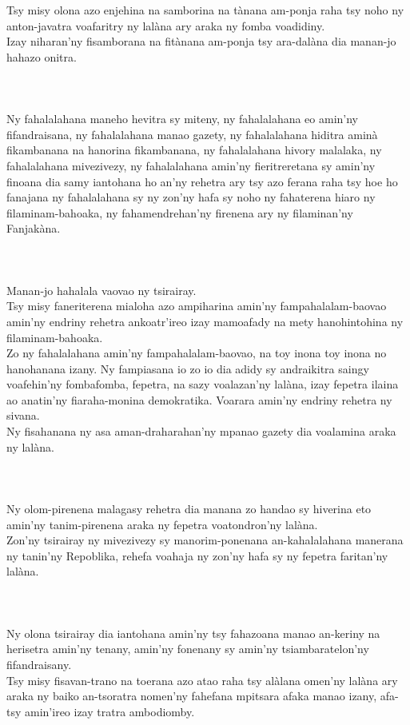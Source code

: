 \documentclass[12pt]{article}
\newcounter{laharana}
\newcommand{\andininy}[0]{
  \paragraph{%
    \NoCaseChange{%
      Andininy~\addtocounter{laharana}{1}\thelaharana.}\label{and:\thelaharana}~%
  }%
}
\begin{document}
\noindent
Tsy misy olona azo enjehina na samborina na tànana am-ponja raha tsy noho ny
anton-javatra voafaritry ny lalàna ary araka ny fomba voadidiny.\\

\noindent
Izay niharan'ny fisamborana na fitànana am-ponja tsy ara-dalàna dia manan-jo
hahazo onitra.

\andininy{}Ny fahalalahana maneho hevitra sy miteny, ny fahalalahana eo amin'ny
fifandraisana, ny fahalalahana manao gazety, ny fahalalahana hiditra aminà
fikambanana na hanorina fikambanana, ny fahalalahana hivory malalaka, ny
fahalalahana mivezivezy, ny fahalalahana amin'ny fieritreretana sy amin'ny
finoana dia samy iantohana ho an'ny rehetra ary tsy azo ferana raha tsy hoe ho
fanajana ny fahalalahana sy ny zon'ny hafa sy noho ny fahaterena hiaro ny
filaminam-bahoaka, ny fahamendrehan'ny firenena ary ny filaminan'ny Fanjakàna.

\andininy{}Manan-jo hahalala vaovao ny tsirairay.\\

\noindent
Tsy misy faneriterena mialoha azo ampiharina amin'ny fampahalalam-baovao amin'ny
endriny rehetra ankoatr'ireo izay mamoafady na mety hanohintohina ny
filaminam-bahoaka.\\

\noindent
Zo ny fahalalahana amin'ny fampahalalam-baovao, na toy inona toy inona no
hanohanana izany. Ny fampiasana io zo io dia adidy sy andraikitra saingy
voafehin'ny fombafomba, fepetra, na sazy voalazan'ny lalàna, izay fepetra ilaina
ao anatin'ny fiaraha-monina demokratika. Voarara amin'ny endriny rehetra ny
sivana.\\

\noindent
Ny fisahanana ny asa aman-draharahan'ny mpanao gazety dia voalamina araka ny
lalàna.

\andininy{}Ny olom-pirenena malagasy rehetra dia manana zo handao sy hiverina
eto amin'ny tanim-pirenena araka ny fepetra voatondron'ny lalàna.\\

\noindent
Zon'ny tsirairay ny mivezivezy sy manorim-ponenana an-kahalalahana manerana ny
tanin'ny Repoblika, rehefa voahaja ny zon'ny hafa sy ny fepetra faritan'ny
lalàna.

\andininy{}Ny olona tsirairay dia iantohana amin'ny tsy fahazoana manao
an-keriny na herisetra amin'ny tenany, amin'ny fonenany sy amin'ny
tsiambaratelon'ny fifandraisany.\\

\noindent
Tsy misy fisavan-trano na toerana azo atao raha tsy alàlana omen'ny lalàna ary
araka ny baiko an-tsoratra nomen'ny fahefana mpitsara afaka manao izany, afa-tsy
amin'ireo izay tratra ambodiomby.\\
\end{document}
